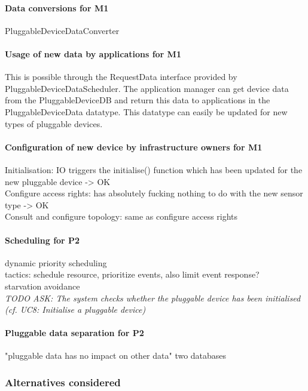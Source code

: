     \paragraph{Data conversions for M1}
        PluggableDeviceDataConverter

    \paragraph{Usage of new data by applications for M1}
        This is possible through the RequestData interface provided by PluggableDeviceDataScheduler.
        The application manager can get device data from the PluggableDeviceDB and return this
        data to applications in the PluggableDeviceData datatype. This datatype can easily be
        updated for new types of pluggable devices.

    \paragraph{Configuration of new device by infrastructure owners for M1}
        Initialisation: IO triggers the initialise() function which has been
        updated for the new pluggable device -> OK\\
        Configure access rights: has absolutely fucking nothing to do with the
        new sensor type -> OK \\
        Consult and configure topology: same as configure access rights

    \paragraph{Scheduling for P2}
        dynamic priority scheduling \\
        tactics: schedule resource, prioritize events, also limit event response?\\
        starvation avoidance \\
        \textit{TODO ASK: The  system  checks  whether  the  pluggable  device
        has  been  initialised (cf. UC8: Initialise  a pluggable device)}

    \paragraph{Pluggable data separation for P2}
        "pluggable data has no impact on other data"
        two databases

    \subsubsection{Alternatives considered}
